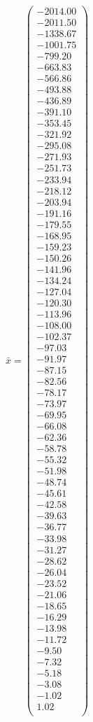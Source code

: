 \documentclass[a4paper,12pt]{article}
\begin{document}
$\bar { x } = \begin{pmatrix}
-2014.00 \\
-2011.50 \\
-1338.67 \\
-1001.75 \\
-799.20 \\
-663.83 \\
-566.86 \\
-493.88 \\
-436.89 \\
-391.10 \\
-353.45 \\
-321.92 \\
-295.08 \\
-271.93 \\
-251.73 \\
-233.94 \\
-218.12 \\
-203.94 \\
-191.16 \\
-179.55 \\
-168.95 \\
-159.23 \\
-150.26 \\
-141.96 \\
-134.24 \\
-127.04 \\
-120.30 \\
-113.96 \\
-108.00 \\
-102.37 \\
-97.03 \\
-91.97 \\
-87.15 \\
-82.56 \\
-78.17 \\
-73.97 \\
-69.95 \\
-66.08 \\
-62.36 \\
-58.78 \\
-55.32 \\
-51.98 \\
-48.74 \\
-45.61 \\
-42.58 \\
-39.63 \\
-36.77 \\
-33.98 \\
-31.27 \\
-28.62 \\
-26.04 \\
-23.52 \\
-21.06 \\
-18.65 \\
-16.29 \\
-13.98 \\
-11.72 \\
-9.50 \\
-7.32 \\
-5.18 \\
-3.08 \\
-1.02 \\
1.02 \\
\end{pmatrix}
$
\end{document}
